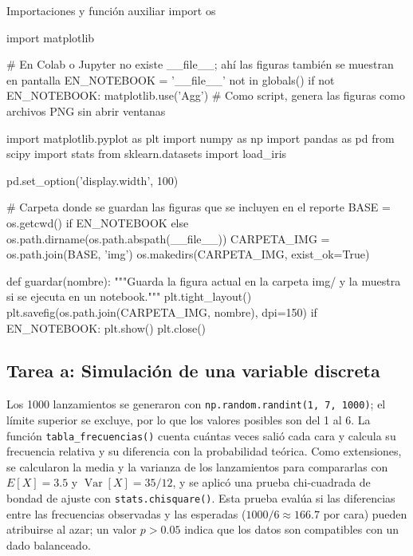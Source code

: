 \documentclass[11pt,letterpaper]{article}
\begin{document}
\begin{codigo}[label=cod:comun]{Importaciones y función auxiliar}
import os

import matplotlib

# En Colab o Jupyter no existe __file__; ahí las figuras también se muestran en pantalla
EN_NOTEBOOK = '__file__' not in globals()
if not EN_NOTEBOOK:
    matplotlib.use('Agg')  # Como script, genera las figuras como archivos PNG sin abrir ventanas

import matplotlib.pyplot as plt
import numpy as np
import pandas as pd
from scipy import stats
from sklearn.datasets import load_iris

pd.set_option('display.width', 100)

# Carpeta donde se guardan las figuras que se incluyen en el reporte
BASE = os.getcwd() if EN_NOTEBOOK else os.path.dirname(os.path.abspath(__file__))
CARPETA_IMG = os.path.join(BASE, 'img')
os.makedirs(CARPETA_IMG, exist_ok=True)


def guardar(nombre):
    """Guarda la figura actual en la carpeta img/ y la muestra si se ejecuta en un notebook."""
    plt.tight_layout()
    plt.savefig(os.path.join(CARPETA_IMG, nombre), dpi=150)
    if EN_NOTEBOOK:
        plt.show()
    plt.close()
\end{codigo}

\subsection{Tarea a: Simulación de una variable discreta}

Los 1000 lanzamientos se generaron con \texttt{np.random.randint(1, 7, 1000)}; el límite superior se excluye, por lo que los valores posibles son del 1 al 6. La función \texttt{tabla\_frecuencias()} cuenta cuántas veces salió cada cara y calcula su frecuencia relativa y su diferencia con la probabilidad teórica. Como extensiones, se calcularon la media y la varianza de los lanzamientos para compararlas con $E[X] = 3.5$ y $\operatorname{Var}[X] = 35/12$, y se aplicó una prueba chi-cuadrada de bondad de ajuste con \texttt{stats.chisquare()}. Esta prueba evalúa si las diferencias entre las frecuencias observadas y las esperadas ($1000/6 \approx 166.7$ por cara) pueden atribuirse al azar; un valor $p > 0.05$ indica que los datos son compatibles con un dado balanceado.
\end{document}
